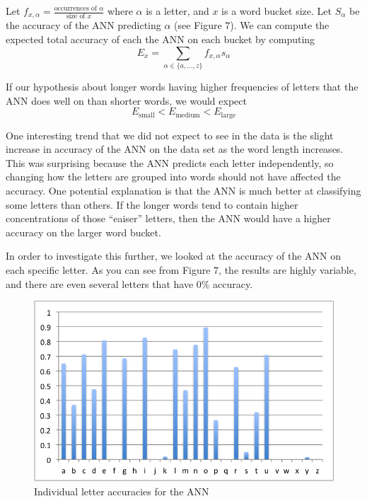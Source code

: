 \documentclass[11pt,a4paper,twocolumn]{article}
\begin{document}
Let $f_{x,\alpha}=\frac{\textrm{occurrences of }\alpha}{\textrm{size of }x}$ where $\alpha$ is a letter, and $x$ is a word bucket size. Let $S_\alpha$ be the accuracy of the ANN predicting $\alpha$ (see Figure 7). We can compute the expected total accuracy of each the ANN on each bucket by computing
\begin{equation}
E_x = \sum_{\alpha \in \{a,\ldots, z\}}f_{x,\alpha} s_\alpha
\end{equation}

If our hypothesis about longer words having higher frequencies of letters that the ANN does well on than shorter words, we would expect 
\begin{equation*}
E_{\textrm{small}} < E_{\textrm{medium}} < E_{\textrm{large}}
\end{equation*}


One interesting trend that we did not expect to see in the data is the slight increase in accuracy
of the ANN on the data set as the word length increases. This was surprising because the ANN
predicts each letter independently, so changing how the letters are grouped into words should not
have affected the accuracy. One potential explanation is that the ANN is much better at classifying
some letters than others. If the longer words tend to contain higher concentrations of those
``eaiser'' letters, then the ANN would have a higher accuracy on the larger word bucket. 

In order to investigate this further, we looked at the accuracy of the ANN on each specific letter.
As you can see from Figure 7, the results are highly variable, and there are even several letters
that have 0\% accuracy.

\begin{figure}[h]
\centering
\caption{Individual letter accuracies for the ANN}
\includegraphics[scale=0.55]{img/letterPercentages.png}
\end{figure} 
\end{document}
